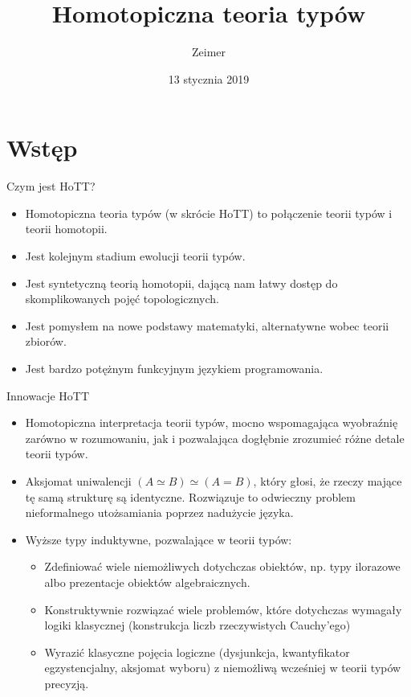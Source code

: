 \documentclass{beamer}
\title{Homotopiczna teoria typów}
\author{Zeimer}
\date{13 stycznia 2019}
\begin{document}
\frame{\titlepage}

\frame{\tableofcontents}

\section{Wstęp}

\begin{frame}{Czym jest HoTT?}
\begin{itemize}
	\item Homotopiczna teoria typów (w skrócie HoTT) to połączenie teorii typów i teorii homotopii.
	\item Jest kolejnym stadium ewolucji teorii typów.
	\item Jest syntetyczną teorią homotopii, dającą nam łatwy dostęp do skomplikowanych pojęć topologicznych.
	\item Jest pomysłem na nowe podstawy matematyki, alternatywne wobec teorii zbiorów.
	\item Jest bardzo potężnym funkcyjnym językiem programowania.
\end{itemize}
\end{frame}

\begin{frame}{Innowacje HoTT}
\begin{itemize}
	\item Homotopiczna interpretacja teorii typów, mocno wspomagająca wyobraźnię zarówno w rozumowaniu, jak i pozwalająca dogłębnie zrozumieć różne detale teorii typów.
	\item Aksjomat uniwalencji $(A \simeq B) \simeq (A = B)$, który głosi, że rzeczy mające tę samą strukturę są identyczne. Rozwiązuje to odwieczny problem nieformalnego utożsamiania poprzez nadużycie języka.
	\item Wyższe typy induktywne, pozwalające w teorii typów:
	\begin{itemize}
		\item Zdefiniować wiele niemożliwych dotychczas obiektów, np. typy ilorazowe albo prezentacje obiektów algebraicznych.
		\item Konstruktywnie rozwiązać wiele problemów, które dotychczas wymagały logiki klasycznej (konstrukcja liczb rzeczywistych Cauchy'ego)
		\item Wyrazić klasyczne pojęcia logiczne (dysjunkcja, kwantyfikator egzystencjalny, aksjomat wyboru) z niemożliwą wcześniej w teorii typów precyzją.
	\end{itemize}
\end{itemize}
\end{frame}
\end{document}
